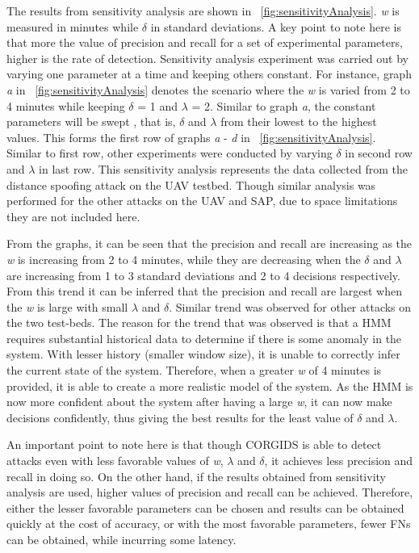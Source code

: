 The results from sensitivity analysis are shown in ~\autoref{fig:sensitivityAnalysis}. \textit{w} is measured in minutes while $\delta$ in standard deviations. A key point to note here is that more the value of precision and recall for a set of experimental parameters, higher is the rate of detection. Sensitivity analysis experiment was carried out by varying one parameter at a time and keeping others constant. For instance, graph \textit{a} in ~\autoref{fig:sensitivityAnalysis} denotes the scenario where the \textit{w} is varied from 2 to 4 minutes while keeping $\delta$ = 1 and $\lambda$ = 2. Similar to graph \textit{a}, the constant parameters will be swept , that is, $\delta$ and $\lambda$ from their lowest to the highest values. This forms the first row of graphs \textit{a} - \textit{d} in ~\autoref{fig:sensitivityAnalysis}. Similar to first row, other experiments were conducted by varying $\delta$ in second row and $\lambda$ in last row. This sensitivity analysis represents the data collected from the distance spoofing attack on the UAV testbed. Though similar analysis was performed for the other attacks on the UAV and SAP, due to space limitations they are not included here. 

From the graphs, it can be seen that the precision and recall are increasing as the \textit{w} is increasing from 2 to 4 minutes, while they are decreasing when the $\delta$ and $\lambda$ are increasing from 1 to 3 standard deviations and 2 to 4 decisions respectively. From this trend it can be inferred that the precision and recall are largest when the \textit{w} is large with small $\lambda$ and $\delta$. Similar trend was observed for other attacks on the two test-beds. The reason for the trend that was observed is that a HMM requires substantial historical data to determine if there is some anomaly in the system. With lesser history (smaller window size), it is unable to correctly infer the current state of the system. Therefore, when a greater \textit{w} of 4 minutes is provided, it is able to create a more realistic model of the system. As the HMM is now more confident about the system after having a large \textit{w}, it can now make decisions confidently, thus giving the best results for the least value of $\delta$ and $\lambda$.


An important point to note here is that though CORGIDS is able to detect attacks even with less favorable values of \textit{w}, $\lambda$ and $\delta$, it achieves less precision and recall in doing so. On the other hand, if the results obtained from sensitivity analysis are used, higher values of precision and recall can be achieved. Therefore, either the lesser favorable parameters can be chosen and results can be obtained  quickly at the cost of accuracy, or with the most favorable parameters, fewer FNs can be obtained, while incurring some latency.


